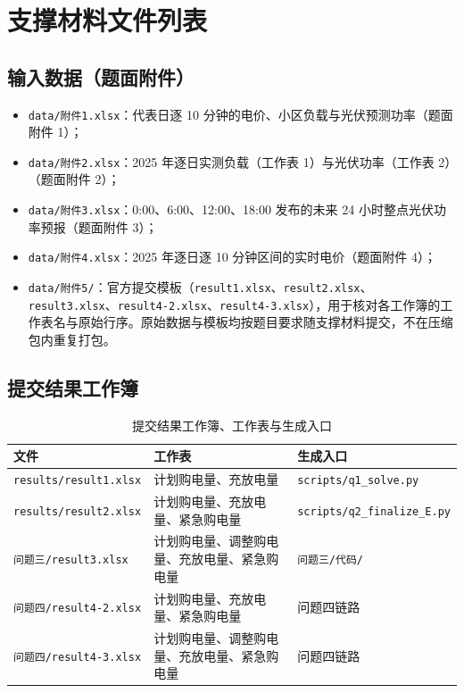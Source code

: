 
\section{支撑材料文件列表}

\subsection{输入数据（题面附件）}

\begin{itemize}
  \item \texttt{data/附件1.xlsx}：代表日逐 10 分钟的电价、小区负载与光伏预测功率（题面附件 1）；
  \item \texttt{data/附件2.xlsx}：2025 年逐日实测负载（工作表 1）与光伏功率（工作表 2）（题面附件 2）；
  \item \texttt{data/附件3.xlsx}：0:00、6:00、12:00、18:00 发布的未来 24 小时整点光伏功率预报（题面附件 3）；
  \item \texttt{data/附件4.xlsx}：2025 年逐日逐 10 分钟区间的实时电价（题面附件 4）；
  \item \texttt{data/附件5/}：官方提交模板（\texttt{result1.xlsx}、\texttt{result2.xlsx}、\texttt{result3.xlsx}、\texttt{result4-2.xlsx}、\texttt{result4-3.xlsx}），用于核对各工作簿的工作表名与原始行序。原始数据与模板均按题目要求随支撑材料提交，不在压缩包内重复打包。
\end{itemize}

\subsection{提交结果工作簿}

\begin{table}[H]
  \centering
  \caption{提交结果工作簿、工作表与生成入口}
  \label{tab:app-workbooks}
  \small
  \setlength{\tabcolsep}{4pt}
  \begin{tabularx}{\textwidth}{l>{\raggedright\arraybackslash}Xl}
    \toprule
    文件 & 工作表 & 生成入口 \\
    \midrule
    \texttt{results/result1.xlsx} & 计划购电量、充放电量 & \texttt{scripts/q1\_solve.py} \\
    \texttt{results/result2.xlsx} & 计划购电量、充放电量、紧急购电量 & \texttt{scripts/q2\_finalize\_E.py} \\
    \texttt{问题三/result3.xlsx} & 计划购电量、调整购电量、充放电量、紧急购电量 & \texttt{问题三/代码/} \\
    \texttt{问题四/result4-2.xlsx} & 计划购电量、充放电量、紧急购电量 & 问题四链路 \\
    \texttt{问题四/result4-3.xlsx} & 计划购电量、调整购电量、充放电量、紧急购电量 & 问题四链路 \\
    \bottomrule
  \end{tabularx}
\end{table}


